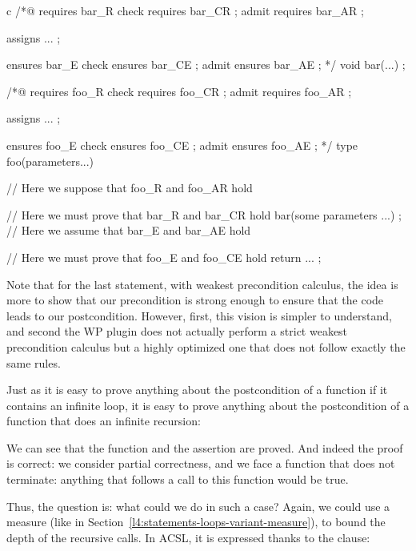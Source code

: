 \begin{CodeBlock}{c}
/*@       requires bar_R
    check requires bar_CR ;
    admit requires bar_AR ;

    assigns ... ;

          ensures bar_E
    check ensures bar_CE ;
    admit ensures bar_AE ;
*/
void bar(...) ;

/*@       requires foo_R
    check requires foo_CR ;
    admit requires foo_AR ;

    assigns ... ;

          ensures foo_E
    check ensures foo_CE ;
    admit ensures foo_AE ;
*/
type foo(parameters...){
  // Here we suppose that foo_R and foo_AR hold


  // Here we must prove that bar_R and bar_CR hold
  bar(some parameters ...) ;
  // Here we assume that bar_E and bar_AE hold


  // Here we must prove that foo_E and foo_CE hold
  return ... ;
}
\end{CodeBlock}


Note that for the last statement, with weakest precondition calculus, the idea
is more to show that our precondition is strong enough to ensure that the code
leads to our postcondition. However, first, this vision is simpler to
understand, and second the WP plugin does not actually perform a strict weakest
precondition calculus but a highly optimized one that does not follow exactly
the same rules.




Just as it is easy to prove anything about the postcondition of a function if it
contains an infinite loop, it is easy to prove anything about the postcondition
of a function that does an infinite recursion:






We can see that the function and the assertion are proved. And indeed the
proof is correct: we consider partial correctness, and we face a function
that does not terminate: anything that follows a call to this function would
be true.


Thus, the question is: what could we do in such a case? Again, we could use
a measure (like in Section~\ref{l4:statements-loops-variant-measure}), to
bound the depth of the recursive calls. In ACSL, it is expressed thanks to the
 clause:




